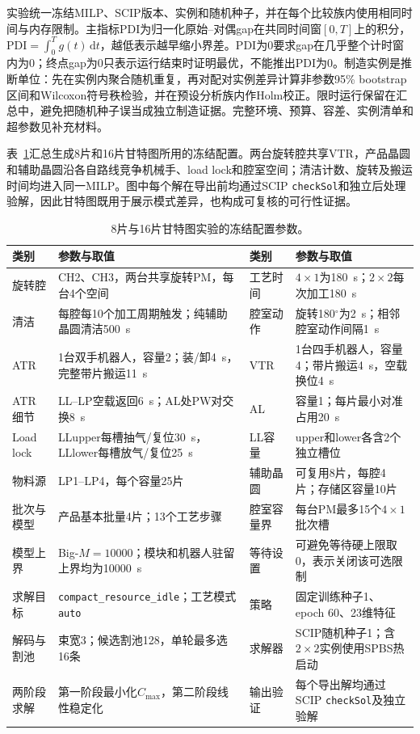 \documentclass[final,5p,times,twocolumn]{elsarticle}
\newcommand{\pdi}{\mathrm{PDI}}
\begin{document}
实验统一冻结MILP、SCIP版本、实例和随机种子，并在每个比较族内使用相同时间与内存限制。主指标PDI为归一化原始--对偶gap在共同时间窗$[0,T]$上的积分，$\pdi=\int_0^Tg(t)\,\mathrm dt$，越低表示越早缩小界差。PDI为0要求gap在几乎整个计时窗内为0；终点gap为0只表示运行结束时证明最优，不能推出PDI为0。制造实例是推断单位：先在实例内聚合随机重复，再对配对实例差异计算非参数95\% bootstrap区间和Wilcoxon符号秩检验，并在预设分析族内作Holm校正\citep{gleixner2021miplib}。限时运行保留在汇总中，避免把随机种子误当成独立制造证据。完整环境、预算、容差、实例清单和超参数见补充材料。

表~\ref{tab:gantt-config-zh}汇总生成8片和16片甘特图所用的冻结配置。两台旋转腔共享VTR，产品晶圆和辅助晶圆沿各自路线竞争机械手、load lock和腔室空间；清洁计数、旋转及搬运时间均进入同一MILP。图中每个解在导出前均通过SCIP \texttt{checkSol}和独立后处理验解，因此甘特图既用于展示模式差异，也构成可复核的可行性证据。

\begin{table}[!htbp]
\centering
\scriptsize
\caption{8片与16片甘特图实验的冻结配置参数。}
\label{tab:gantt-config-zh}
\begin{tabular}{p{} p{} p{} p{}}
\toprule
类别 & 参数与取值 & 类别 & 参数与取值\\
\midrule
旋转腔 & CH2、CH3，两台共享旋转PM，每台4个空间 & 工艺时间 & $4\times1$为180~s；$2\times2$每次加工180~s\\
清洁 & 每腔每10个加工周期触发；纯辅助晶圆清洁500~s & 腔室动作 & 旋转180$^\circ$为2~s；相邻腔室动作间隔1~s\\
ATR & 1台双手机器人，容量2；装/卸4~s，完整带片搬运11~s & VTR & 1台四手机器人，容量4；带片搬运4~s，空载换位4~s\\
ATR细节 & LL--LP空载返回6~s；AL处PW对交换8~s & AL & 容量1；每片最小对准占用20~s\\
Load lock & LLupper每槽抽气/复位30~s，LLlower每槽放气/复位25~s & LL容量 & upper和lower各含2个独立槽位\\
物料源 & LP1--LP4，每个容量25片 & 辅助晶圆 & 可复用8片，每腔4片；存储区容量10片\\
批次与模型 & 产品基本批量4片；13个工艺步骤 & 腔室容量界 & 每台PM最多15个$4\times1$批次槽\\
模型上界 & Big-$M=10000$；模块和机器人驻留上界均为10000~s & 等待设置 & 可避免等待硬上限取0，表示关闭该可选限制\\
求解目标 & \texttt{compact\_resource\_idle}；工艺模式\texttt{auto} & 策略 & 固定训练种子1、epoch 60、23维特征\\
解码与割池 & 束宽3；候选割池128，单轮最多选16条 & 求解器 & SCIP随机种子1；含$2\times2$实例使用SPBS热启动\\
两阶段求解 & 第一阶段最小化$C_{\max}$，第二阶段线性稳定化 & 输出验证 & 每个导出解均通过SCIP \texttt{checkSol}及独立验解\\
\bottomrule
\end{tabular}
\end{table}
\end{document}
